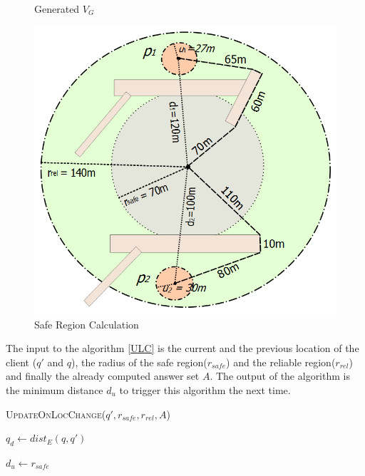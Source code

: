 \documentclass{sig-alternate}
\begin{document}
\begin{figure}[!htb]
  \caption{Generated $V_G$}\label{fig:poi_obs_path}
\endminipage\hfill
{}%
  \includegraphics[width=\linewidth]{safe_region.png}
  \caption{Safe Region Calculation}\label{fig:safe_region}
\endminipage
\end{figure}


The input to the algorithm \ref{ULC} is the current and the previous location of the client ($q'$ and $q$), the radius of the safe region($r_{safe}$) and the reliable region($r_{rel}$) and finally the already computed answer set $A$. The output of the algorithm is the minimum distance $d_u$ to trigger this algorithm the next time.

\begin{algorithm}
\caption{\textsc{UpdateOnLocChange}($q', r_{safe}, r_{rel}, A$)}
\label{ULC}

    $q_d \gets dist_E(q, q')$
    
    
    
    \Return $d_u \gets r_{safe}$

\end{algorithm}
\end{document}
